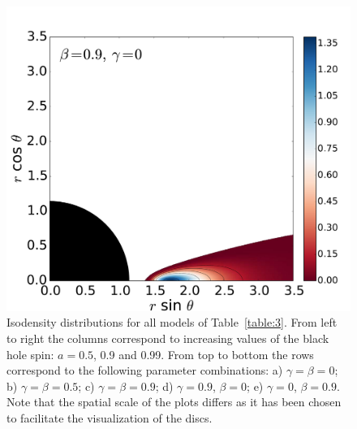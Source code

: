 \documentclass{aa}
\begin{document}
\begin{figure}
\includegraphics[scale=0.14]{figures/fig2_5_3.pdf}
\caption{Isodensity distributions for all models of Table~\ref{table:3}. From left to right the columns correspond to increasing values of the black hole spin: $a=0.5$, 0.9 and 0.99. From top to bottom the rows correspond to the following parameter combinations: a) $\gamma=\beta=0$; b) $\gamma=\beta=0.5$; c) $\gamma=\beta=0.9$; d) $\gamma=0.9$, $\beta=0$; e) $\gamma=0$, $\beta=0.9$. Note that the spatial scale of the plots differs as it has been chosen to facilitate the visualization of the discs.}
\label{models}
\end{figure}
\end{document}
